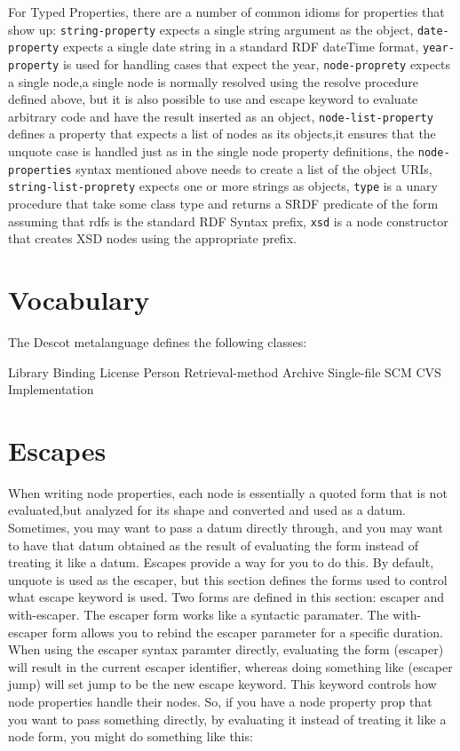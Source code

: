 For Typed Properties, there are a number of common idioms for properties 
that show up: {\tt string-property} expects a single string argument as 
the object, {\tt date-property} expects a single date string in a standard 
RDF dateTime format, {\tt year-property} is used for handling cases that 
expect the year, {\tt node-proprety} expects a single node,a single node is 
normally resolved using the resolve procedure defined above, but it is also
possible to use and escape keyword to evaluate arbitrary code and have the 
result inserted as an object, {\tt node-list-property} defines a property 
that expects a list of nodes as its objects,it ensures that the unquote 
case is handled just as in the single node property definitions, the 
{\tt node-properties} syntax mentioned above needs to create a list of 
the object URIs, {\tt string-list-proprety} expects one or more 
strings as objects, {\tt type} is a unary procedure that take some class type 
and returns a SRDF predicate of the form assuming that rdfs is the 
standard RDF Syntax prefix, {\tt xsd} is a node constructor that creates XSD 
nodes using the appropriate prefix.


\section{Vocabulary}{}%
The Descot metalanguage defines the following classes:

\unorderedlist
\li Library
\li Binding
\li License
\li Person
\li Retrieval-method
\li Archive
\li Single-file
\li SCM
\li CVS
\li Implementation
\endunorderedlist

\section{Escapes}{}%
When writing node properties, each node is essentially a quoted form 
that is not evaluated,but analyzed for its shape and converted and 
used as a datum. Sometimes, you may want to pass a datum directly through, 
and you may want to have that datum obtained as the result of evaluating
the form instead of treating it like a datum. Escapes provide a way for 
you to do this. By default, unquote is used as the escaper, but this 
section defines the forms used to control what escape keyword is used.
Two forms are defined in this section: escaper and with-escaper. 
The escaper form works like a syntactic paramater. The with-escaper 
form allows you to rebind the escaper parameter for a specific
duration.
When using the escaper syntax paramter directly, evaluating the 
form (escaper) will result in the current escaper identifier, whereas 
doing something like (escaper jump) will set jump to be the new escape
keyword. This keyword controls how node properties handle their nodes. 
So, if you have a node property prop that you want to pass something 
directly, by evaluating it instead of treating it like a node form,
you might do something like this:

